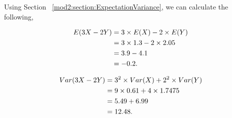\begin{subquestions}
\begin{subsubquestions}
\begin{subsubsubquestions}
\end{subsubsubquestions}


\subsubquestion

Using Section ~\ref{mod2:section:ExpectationVariance}, we can calculate the following,

\begin{subsubsubquestions}
	
\subsubsubquestion

\begin{align}
	E(3X-2Y) & = 3 \times E(X) - 2 \times E(Y) \nonumber \\
	         & = 3 \times 1.3 - 2 \times 2.05 \nonumber \\
	         & = 3.9 - 4.1 \nonumber \\
	         & = -0.2.
\end{align}

\subsubsubquestion

\begin{align}
	Var(3X-2Y) & = 3^2 \times Var(X) + 2^2 \times Var(Y) \nonumber \\
	           & = 9 \times 0.61 + 4 \times 1.7475 \nonumber \\
	           & = 5.49 + 6.99 \nonumber \\
	           & = 12.48.
\end{align}

\end{subsubsubquestions}

\end{subsubquestions}

\end{subquestions}

